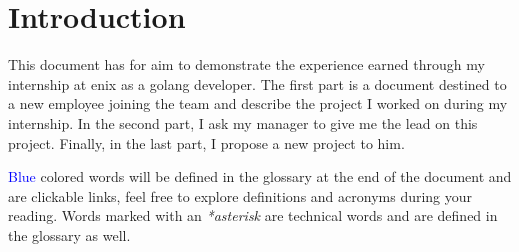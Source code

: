 \chapter{Introduction}





This document has for aim to demonstrate the experience earned through my internship at \gls{enix} as a golang developer. The first part is a document destined to a new employee joining the team and describe the project I worked on during my internship. In the second part, I ask my manager to give me the lead on this project. Finally, in the last part, I propose a new project to him.

\textcolor{blue}{Blue} colored words will be defined in the glossary at the end of the document and are clickable links, feel free to explore definitions and acronyms during your reading. Words marked with an \emph{*asterisk} are technical words and are defined in the glossary as well.

\clearpage
\blankpage
